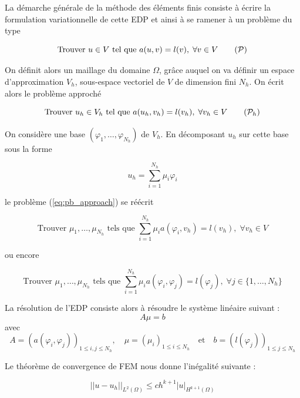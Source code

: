 \documentclass[french]{article}
\begin{document}
	La démarche générale de la méthode des éléments finis consiste à écrire la formulation variationnelle de cette EDP et ainsi à se ramener à un problème du type
	
	\begin{equation}
		\text{Trouver } u\in V \text{ tel que } a(u,v)=l(v), \;\forall v\in V \tag{$\mathcal{P}$}
	\end{equation}

	On définit alors un maillage du domaine $\Omega$, grâce auquel on va définir un espace d'approximation $V_h$, sous-espace vectoriel de $V$ de dimension fini $N_h$. On écrit alors le problème approché

	\begin{equation}
		\text{Trouver } u_h\in V_h \text{ tel que } a(u_h,v_h)=l(v_h), \;\forall v_h\in V \tag{$\mathcal{P}_h$} \label{eq:pb_approach}
	\end{equation}

	On considère une base $(\varphi_1,\dots,\varphi_{N_h})$ de $V_h$. En décomposant $u_h$ sur cette base sous la forme
	
	\begin{equation}
		\label{decomp1}
		u_h=\sum_{i=1}^{N_h}\mu_i\varphi_i	
	\end{equation}
	
	le problème (\ref{eq:pb_approach}) se réécrit 
	
	\begin{equation*}
		\text{Trouver } \mu_1,\dots,\mu_{N_h} \text{ tels que } \sum_{i=1}^{N_h}\mu_i a(\varphi_i,v_h)=l(v_h), \;\forall v_h\in V 
	\end{equation*}

	ou encore
	
	\begin{equation*}
		\text{Trouver } \mu_1,\dots,\mu_{N_h} \text{ tels que } \sum_{i=1}^{N_h}\mu_i a(\varphi_i,\varphi_j)=l(\varphi_j), \;\forall j\in \{1,\dots,N_h\}
	\end{equation*}
	
	La résolution de l'EDP consiste alors à résoudre le système linéaire suivant :
	$$A\mu=b$$
	avec
	$$A=(a(\varphi_i,\varphi_j))_{1\le i,j\le N_h}, \quad \mu=(\mu_i)_{1\le i\le N_h} \quad \text{et} \quad b=(l(\varphi_j))_{1\le j\le N_h}$$
	
	Le théorème de convergence de FEM nous donne l'inégalité suivante :
	
	\begin{equation}
		||u-u_h||_{L^2(\Omega)}\le ch^{k+1}|u|_{H^{k+1}(\Omega)} \label{ine1}
	\end{equation}
	
\end{document}
